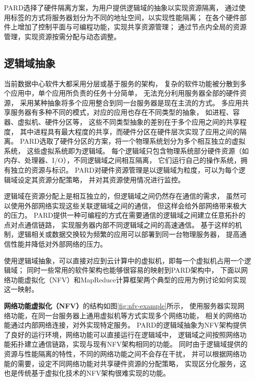 PARD选择了硬件隔离方案，为用户提供逻辑域的抽象以实现资源隔离，
通过使用标签的方式将服务器划分为不同的地址空间，以实现性能隔离；
在各个硬件部件上增加了控制平面与可编程功能，实现共享资源管理；
通过节点内全局的资源管理，实现资源按需分配与动态调整。


\subsection{逻辑域抽象}

当前数据中心软件大都采用分层或基于服务的架构，
复杂的软件功能被分散到多个应用中，单个应用所负责的任务十分简单，
无法充分利用服务器全部的硬件资源，
采用某种抽象将多个应用整合到同一台服务器是现在主流的方式。
多应用共享服务器有多种不同的模式，对应的应用也存在不同类型的抽象，
如进程、容器、虚拟机、硬件分区\cite{LDom,IBM_LPAR:2007}等，
这些不同类型抽象的差别在于多个应用之间的共享程度，
其中进程具有最大程度的共享，而硬件分区在硬件层次实现了应用之间的隔离。
PARD选取了硬件分区的方案，将一个物理系统划分为多个相互独立的虚拟系统，
这些虚拟系统即为逻辑域。
每个逻辑域只包含物理系统部分硬件资源（如内存、处理器、I/O），不同逻辑域之间相互隔离，
它们运行自己的操作系统，拥有独立的资源与标识。
PARD对硬件资源管理是以逻辑域为粒度，可以为每个逻辑域设定其资源分配策略，
并对其资源使用情况进行监控。

逻辑域在资源分配上是相互独立的，但逻辑域之间仍然存在通信的需求，
虽然可以使用外部网络实现这些关联逻辑域之间的通信，
但这样会给外部网络带来极大的压力\cite{}。 %
PARD提供一种可编程的方式在需要通信的逻辑域之间建立任意拓扑的点对点通信链路，
实现服务器内部不同逻辑域之间的高速通信。
基于这样的机制，逻辑相关或数据交换较为频繁的应用可以部署到同一台物理服务器，
提高通信性能并降低对外部网络的压力。

使用逻辑域抽象，可以直接对应到云计算中的虚拟机，即每一个虚拟机占用一个逻辑域；
同时一些常用的软件架构也能够很容易的映射到PARD架构中，
下面以网络功能虚拟化（NFV）和MapReduce计算框架两个典型的应用为例讨论如何实现这一映射。

\textbf{网络功能虚拟化（NFV）}的结构如图\ref{fig:nfv-example}所示，
使用服务器实现网络功能，在同一台服务器上通用虚拟机等方式实现多个网络功能，
相关的网络功能通过内部网络连接，对外实现特定服务。
PARD的逻辑域抽象为NFV架构提供了良好的运行环境，网络功能可以直接运行在逻辑域中，
逻辑域之间按照网络功能拓扑建立通信链路，实现与现有NFV架构相同的功能。
同时由于逻辑域提供的资源与性能隔离的特性，不同的网络功能之间不会存在干扰，
并可以根据网络功能的需要，设定不同网络功能对共享硬件资源的分配策略，
实现区分化服务，这也是传统基于虚拟化技术的NFV架构很难实现的功能。

